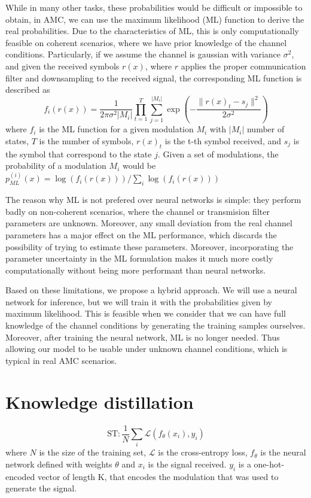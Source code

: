 \documentclass[conference]{IEEEtran}
\newcommand{\Ls}{\mathcal{L}}
\begin{document}
While in many other tasks, these probabilities would be difficult or impossible to obtain, in AMC, we can use the maximum likelihood (ML) function to derive the real probabilities. Due to the characteristics of ML, this is only computationally feasible on coherent scenarios, where we have prior knowledge of the channel conditions. Particularly, if we assume the channel is gaussian with variance $\sigma^{2}$, and given the received symbols $r(x)$, where $r$ applies the proper communication filter and downsampling to the received signal, the corresponding ML function is described as
\begin{equation}
	f_{i}(r(x)) = \dfrac{1}{2\pi \sigma^{2}|M_i|}\prod_{t=1}^{T} \sum_{j=1}^{|M_i|} \exp\left(-\dfrac{\lVert r(x)_t - s_j\rVert^{2}}{2 \sigma^{2}}\right)
\end{equation}
where $f_{i}$ is the ML function for a given modulation $M_i$ with $|M_i|$ number of states, $T$ is the number of symbols, $r(x)_t$ is the t-th symbol received, and $s_j$ is the symbol that correspond to the state $j$. Given a set of modulations, the probability of a modulation $M_i$ would be $p_{ML}^{(i)}(x) = \log(f_{i}(r(x))) / \sum_i \log(f_{i}(r(x)))$

The reason why ML is not prefered over neural networks is simple: they perform badly on non-coherent scenarios, where the channel or transmision filter parameters are unknown. Moreover, any small deviation from the real channel parameters has a major effect on the ML performance, which discards the possibility of trying to estimate these parameters. Moreover, incorporating the parameter uncertainty in the ML formulation makes it much more costly computationally without being more performant than neural networks.

Based on these limitations, we propose a hybrid approach. We will use a neural network for inference, but we will train it with the probabilities given by maximum likelihood. This is feasible when we consider that we can have full knowledge of the channel conditions by generating the training samples ourselves. Moreover, after training the neural network, ML is no longer needed. Thus allowing our model to be usable under unknown channel conditions, which is typical in real AMC scenarios.


\section{Knowledge distillation}

\begin{equation}
    \text{ST} : \dfrac{1}{N}\sum_{i}\Ls(f_{\theta}(x_i), y_i)
\end{equation}
where $N$ is the size of the training set, $\Ls$ is the cross-entropy loss, $f_{\theta}$ is the neural network defined with weights $\theta$ and $x_i$ is the signal received. $y_i$ is a one-hot-encoded vector of length K, that encodes the modulation that was used to generate the signal.
\end{document}
